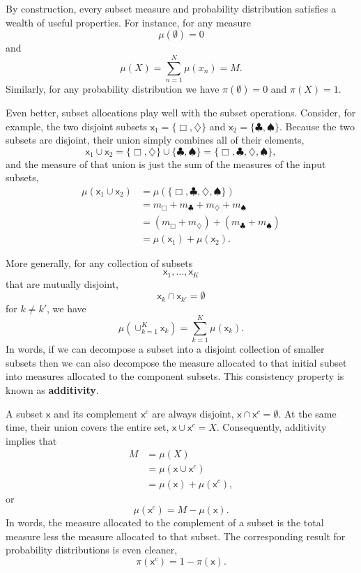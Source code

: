 \documentclass[
  letterpaper,
  DIV=11,
  numbers=noendperiod]{scrartcl}
\begin{document}
By construction, every subset measure and probability distribution
satisfies a wealth of useful properties. For instance, for any measure
\[
\mu( \emptyset ) = 0
\] and \[
\mu( X ) = \sum_{n = 1}^{N} \mu(x_{n}) = M.
\] Similarly, for any probability distribution we have
\(\pi( \emptyset ) = 0\) and \(\pi( X ) = 1\).

Even better, subset allocations play well with the subset operations.
Consider, for example, the two disjoint subsets
\(\mathsf{x}_{1} = \{ \Box, \diamondsuit \}\) and
\(\mathsf{x}_{2} = \{ \clubsuit, \spadesuit \}\). Because the two
subsets are disjoint, their union simply combines all of their elements,
\[
\mathsf{x}_{1} \cup \mathsf{x}_{2}
=
\{ \Box, \diamondsuit \} \cup \{ \clubsuit, \spadesuit \}
=
\{ \Box, \clubsuit, \diamondsuit, \spadesuit \},
\] and the measure of that union is just the sum of the measures of the
input subsets, \begin{align*}
\mu ( \mathsf{x}_{1} \cup \mathsf{x}_{2} )
&=
\mu ( \{ \Box, \clubsuit, \diamondsuit, \spadesuit \} )
\\
&=
m_{\Box} + m_{\clubsuit} + m_{\diamondsuit} + m_{\spadesuit}
\\
&=
( m_{\Box} + m_{\diamondsuit} ) + ( m_{\clubsuit} + m_{\spadesuit} )
\\
&=
\mu( \mathsf{x}_{1} ) + \mu( \mathsf{x}_{2} ).
\end{align*}

More generally, for any collection of subsets \[
\mathsf{x}_{1}, \ldots, \mathsf{x}_{K}
\] that are mutually disjoint, \[
\mathsf{x}_{k} \cap \mathsf{x}_{k'} = \emptyset
\] for \(k \ne k'\), we have \[
\mu ( \cup_{k = 1}^{K} \mathsf{x}_{k} )
=
\sum_{k = 1}^{K} \mu ( \mathsf{x}_{k} ).
\] In words, if we can decompose a subset into a disjoint collection of
smaller subsets then we can also decompose the measure allocated to that
initial subset into measures allocated to the component subsets. This
consistency property is known as \textbf{additivity}.

A subset \(\mathsf{x}\) and its complement \(\mathsf{x}^{c}\) are always
disjoint, \(\mathsf{x} \cap \mathsf{x}^{c} = \emptyset\). At the same
time, their union covers the entire set,
\(\mathsf{x} \cup \mathsf{x}^{c} = X\). Consequently, additivity implies
that \begin{align*}
M
&=
\mu (X)
\\
&=
\mu ( \mathsf{x} \cup \mathsf{x}^{c} )
\\
&= \mu ( \mathsf{x} ) + \mu ( \mathsf{x}^{c} ),
\end{align*} or \[
\mu ( \mathsf{x}^{c} ) = M - \mu ( \mathsf{x} ).
\] In words, the measure allocated to the complement of a subset is the
total measure less the measure allocated to that subset. The
corresponding result for probability distributions is even cleaner, \[
\pi ( \mathsf{x}^{c} ) = 1 - \pi ( \mathsf{x} ).
\]
\end{document}
